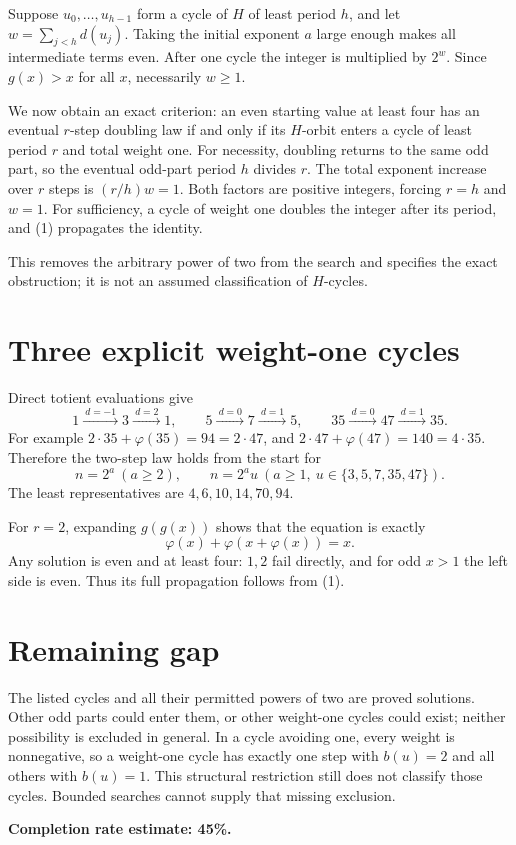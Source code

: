 \documentclass[11pt]{article}
\begin{document}
Suppose $u_0,\ldots,u_{h-1}$ form a cycle of $H$ of least period $h$, and let $w=\sum_{j<h}d(u_j)$. Taking the initial exponent $a$ large enough makes all intermediate terms even. After one cycle the integer is multiplied by $2^w$. Since $g(x)>x$ for all $x$, necessarily $w\ge1$.

We now obtain an exact criterion: an even starting value at least four has an eventual $r$-step doubling law if and only if its $H$-orbit enters a cycle of least period $r$ and total weight one. For necessity, doubling returns to the same odd part, so the eventual odd-part period $h$ divides $r$. The total exponent increase over $r$ steps is $(r/h)w=1$. Both factors are positive integers, forcing $r=h$ and $w=1$. For sufficiency, a cycle of weight one doubles the integer after its period, and (1) propagates the identity.

This removes the arbitrary power of two from the search and specifies the exact obstruction; it is not an assumed classification of $H$-cycles.

\section*{Three explicit weight-one cycles}
Direct totient evaluations give
\[
 1\xrightarrow{\ d=-1\ }3\xrightarrow{\ d=2\ }1,
 \qquad
 5\xrightarrow{\ d=0\ }7\xrightarrow{\ d=1\ }5,
 \qquad
 35\xrightarrow{\ d=0\ }47\xrightarrow{\ d=1\ }35.
\]
For example $2\cdot35+\varphi(35)=94=2\cdot47$, and $2\cdot47+\varphi(47)=140=4\cdot35$. Therefore the two-step law holds from the start for
\[
 n=2^a\ (a\ge2),\qquad
 n=2^a u\ (a\ge1,\ u\in\{3,5,7,35,47\}).
\]
The least representatives are $4,6,10,14,70,94$.

For $r=2$, expanding $g(g(x))$ shows that the equation is exactly
\[
 \varphi(x)+\varphi(x+\varphi(x))=x.
\]
Any solution is even and at least four: $1,2$ fail directly, and for odd $x>1$ the left side is even. Thus its full propagation follows from (1).

\section*{Remaining gap}
The listed cycles and all their permitted powers of two are proved solutions. Other odd parts could enter them, or other weight-one cycles could exist; neither possibility is excluded in general. In a cycle avoiding one, every weight is nonnegative, so a weight-one cycle has exactly one step with $b(u)=2$ and all others with $b(u)=1$. This structural restriction still does not classify those cycles. Bounded searches cannot supply that missing exclusion.

\textbf{Completion rate estimate: 45\%.}
\end{document}
